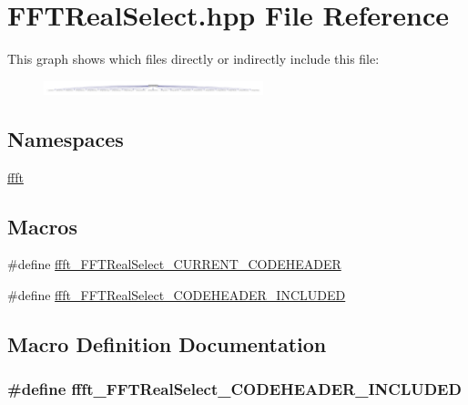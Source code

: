 \hypertarget{a00105}{\section{F\+F\+T\+Real\+Select.\+hpp File Reference}
\label{a00105}
}
This graph shows which files directly or indirectly include this file\+:
\nopagebreak
\begin{figure}[H]
\begin{center}
\leavevmode
\includegraphics[width=181pt]{d0/d19/a00273}
\end{center}
\end{figure}
\subsection*{Namespaces}
\begin{DoxyCompactItemize}
\item 
 \hyperlink{a00142}{ffft}
\end{DoxyCompactItemize}
\subsection*{Macros}
\begin{DoxyCompactItemize}
\item 
\#define \hyperlink{a00105_afbb96f675b29fc93ca1201baac6549a6}{ffft\+\_\+\+F\+F\+T\+Real\+Select\+\_\+\+C\+U\+R\+R\+E\+N\+T\+\_\+\+C\+O\+D\+E\+H\+E\+A\+D\+E\+R}
\item 
\#define \hyperlink{a00105_af126899a30fc9910f64861b24cdd2631}{ffft\+\_\+\+F\+F\+T\+Real\+Select\+\_\+\+C\+O\+D\+E\+H\+E\+A\+D\+E\+R\+\_\+\+I\+N\+C\+L\+U\+D\+E\+D}
\end{DoxyCompactItemize}


\subsection{Macro Definition Documentation}
\hypertarget{a00105_af126899a30fc9910f64861b24cdd2631}{
\subsubsection[{ffft\+\_\+\+F\+F\+T\+Real\+Select\+\_\+\+C\+O\+D\+E\+H\+E\+A\+D\+E\+R\+\_\+\+I\+N\+C\+L\+U\+D\+E\+D}]{\setlength{\rightskip}{0pt plus 5cm}\#define ffft\+\_\+\+F\+F\+T\+Real\+Select\+\_\+\+C\+O\+D\+E\+H\+E\+A\+D\+E\+R\+\_\+\+I\+N\+C\+L\+U\+D\+E\+D}}\label{a00105_af126899a30fc9910f64861b24cdd2631}


